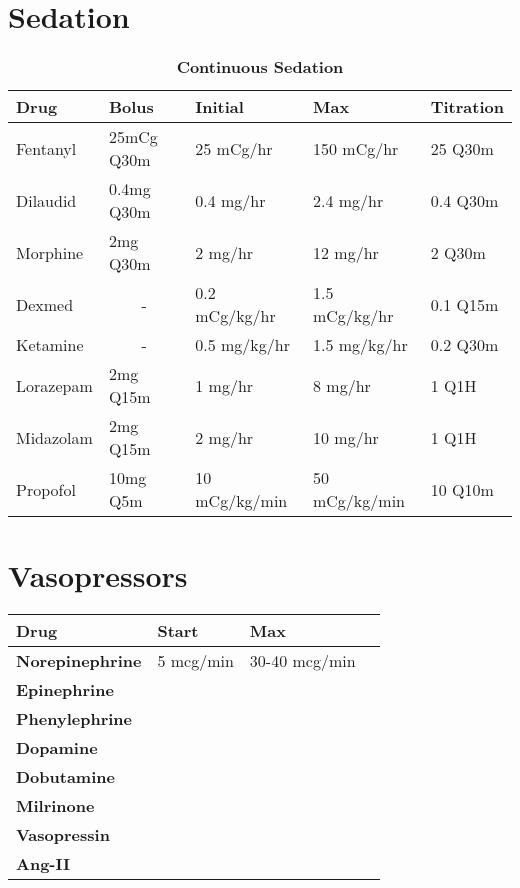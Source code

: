 \documentclass[8pt,twoside]{extarticle}
\begin{document}
\section{Sedation}
\begin{sidewaystable}[H]
	\centering
	\caption*{\textbf{Continuous Sedation}}
	\begin{tabular}{lllll}
		\textbf{Drug} & \textbf{Bolus} & \textbf{Initial} & \textbf{Max} & \textbf{Titration} \\ \hline
		Fentanyl & 25mCg Q30m & 25 mCg/hr & 150 mCg/hr & 25 Q30m \\
		Dilaudid & 0.4mg Q30m & 0.4 mg/hr & 2.4 mg/hr & 0.4 Q30m \\
		Morphine & 2mg Q30m & 2 mg/hr & 12 mg/hr & 2 Q30m \\ \hline
		Dexmed & \multicolumn{1}{c}{-} & 0.2 mCg/kg/hr & 1.5 mCg/kg/hr & 0.1 Q15m \\
		Ketamine & \multicolumn{1}{c}{-} & 0.5 mg/kg/hr & 1.5 mg/kg/hr & 0.2 Q30m \\
		Lorazepam & 2mg Q15m & 1 mg/hr & 8 mg/hr & 1 Q1H \\
		Midazolam & 2mg Q15m & 2 mg/hr & 10 mg/hr & 1 Q1H \\
		Propofol & 10mg Q5m & 10 mCg/kg/min & 50 mCg/kg/min & 10 Q10m
	\end{tabular}
\end{sidewaystable}

\newpage

\section{Vasopressors}
\begin{sidewaystable}[H]
\centering
\begin{tabular}{l l l l}
	\textbf{Drug} & \textbf{Start} & \textbf{Max} \\ \hline
	\textbf{Norepinephrine} & 5 \si{mcg/min} & 30-40 \si{mcg/min} \\
	\textbf{Epinephrine} & & \\
	\textbf{Phenylephrine} & & \\
	\textbf{Dopamine} & & \\ 
	\textbf{Dobutamine} & & \\
	\textbf{Milrinone} & & \\
	\textbf{Vasopressin} & & \\
	\textbf{Ang-II} & & \\
\end{tabular}
\end{sidewaystable}
\end{document}
